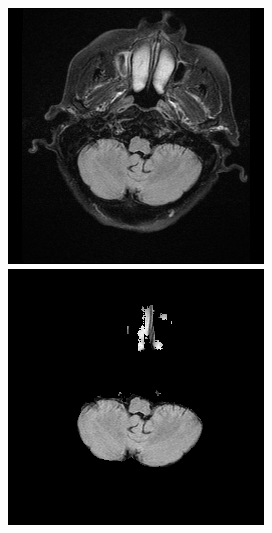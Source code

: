 \documentclass[conference]{IEEEtran}
\begin{document}
\hspace{8mm}
\includegraphics[scale = 0.3]{origin_2.png}
\hspace{22mm}
\includegraphics[scale = 0.3]{stripped_2.png}
\end{document}
